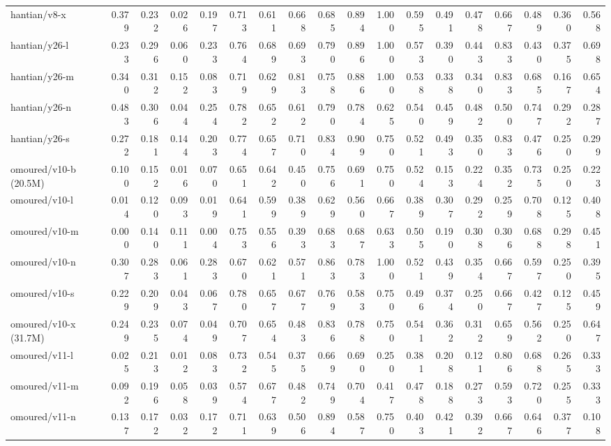 \documentclass[border=2pt]{standalone}
\begin{document}
\begin{tabular}{lrrrrrrrrrrrrrrrrr}
hantian/v8-x & 0.379 & 0.232 & 0.026 & 0.197 & 0.713 & 0.611 & 0.668 & 0.685 & 0.894 & 1.000 & 0.595 & 0.491 & 0.478 & 0.667 & 0.489 & 0.360 & 0.568 \\
hantian/y26-l & 0.233 & 0.296 & 0.060 & 0.233 & 0.764 & 0.689 & 0.693 & 0.790 & 0.896 & 1.000 & 0.573 & 0.390 & 0.443 & 0.833 & 0.430 & 0.375 & 0.698 \\
hantian/y26-m & 0.340 & 0.312 & 0.152 & 0.083 & 0.719 & 0.629 & 0.813 & 0.758 & 0.886 & 1.000 & 0.538 & 0.338 & 0.340 & 0.833 & 0.685 & 0.167 & 0.654 \\
hantian/y26-n & 0.483 & 0.306 & 0.044 & 0.254 & 0.782 & 0.652 & 0.612 & 0.790 & 0.784 & 0.625 & 0.540 & 0.459 & 0.482 & 0.500 & 0.747 & 0.292 & 0.287 \\
hantian/y26-s & 0.272 & 0.181 & 0.144 & 0.203 & 0.774 & 0.657 & 0.710 & 0.834 & 0.909 & 0.750 & 0.521 & 0.493 & 0.350 & 0.833 & 0.476 & 0.250 & 0.299 \\
omoured/v10-b (20.5M) & 0.100 & 0.152 & 0.016 & 0.070 & 0.651 & 0.642 & 0.450 & 0.756 & 0.691 & 0.750 & 0.524 & 0.153 & 0.224 & 0.352 & 0.735 & 0.250 & 0.223 \\
omoured/v10-l & 0.014 & 0.120 & 0.093 & 0.019 & 0.641 & 0.599 & 0.389 & 0.629 & 0.560 & 0.667 & 0.389 & 0.307 & 0.292 & 0.259 & 0.708 & 0.125 & 0.408 \\
omoured/v10-m & 0.000 & 0.140 & 0.111 & 0.004 & 0.753 & 0.556 & 0.393 & 0.683 & 0.687 & 0.633 & 0.505 & 0.190 & 0.308 & 0.306 & 0.688 & 0.298 & 0.451 \\
omoured/v10-n & 0.307 & 0.283 & 0.061 & 0.283 & 0.670 & 0.621 & 0.571 & 0.863 & 0.783 & 1.000 & 0.521 & 0.439 & 0.354 & 0.667 & 0.597 & 0.250 & 0.395 \\
omoured/v10-s & 0.229 & 0.209 & 0.043 & 0.067 & 0.780 & 0.657 & 0.677 & 0.769 & 0.583 & 0.750 & 0.496 & 0.374 & 0.250 & 0.667 & 0.427 & 0.125 & 0.459 \\
omoured/v10-x (31.7M) & 0.249 & 0.235 & 0.074 & 0.049 & 0.707 & 0.654 & 0.483 & 0.836 & 0.788 & 0.750 & 0.541 & 0.362 & 0.312 & 0.659 & 0.562 & 0.250 & 0.647 \\
omoured/v11-l & 0.025 & 0.213 & 0.012 & 0.083 & 0.732 & 0.545 & 0.375 & 0.669 & 0.690 & 0.250 & 0.381 & 0.208 & 0.121 & 0.806 & 0.688 & 0.265 & 0.333 \\
omoured/v11-m & 0.092 & 0.196 & 0.058 & 0.039 & 0.574 & 0.677 & 0.482 & 0.749 & 0.704 & 0.417 & 0.478 & 0.188 & 0.273 & 0.593 & 0.720 & 0.255 & 0.333 \\
omoured/v11-n & 0.137 & 0.172 & 0.032 & 0.172 & 0.711 & 0.639 & 0.506 & 0.894 & 0.587 & 0.750 & 0.403 & 0.421 & 0.392 & 0.667 & 0.646 & 0.377 & 0.108 \\

\end{tabular}
\end{document}
